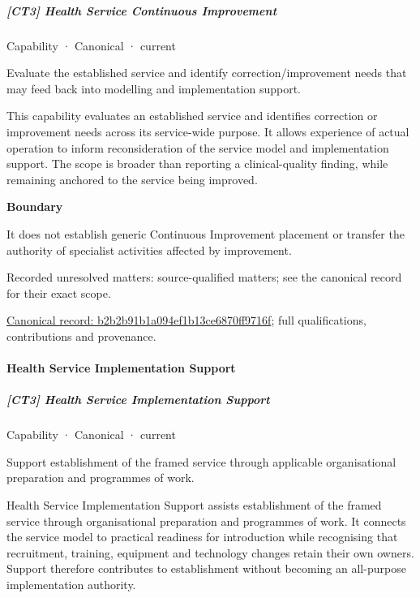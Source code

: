 \subparagraph{[CT3] Health Service Continuous Improvement}

\label{element:b2b2b91b1a094ef1b13ce6870ff9716f}
{\small Capability · Canonical · current}\par

Evaluate the established service and identify correction/improvement needs that may feed back into modelling and implementation support.



This capability evaluates an established service and identifies correction or improvement needs across its service-wide purpose. It allows experience of actual operation to inform reconsideration of the service model and implementation support. The scope is broader than reporting a clinical-quality finding, while remaining anchored to the service being improved.



\textbf{Boundary}



It does not establish generic Continuous Improvement placement or transfer the authority of specialist activities affected by improvement.


{\small Recorded unresolved matters: source-qualified matters; see the canonical record for their exact scope.}\par
{\footnotesize \href{../../../../continuum/strategy/capability/b2b2b91b1a094ef1b13ce6870ff9716f.md}{Canonical record: b2b2b91b1a094ef1b13ce6870ff9716f}; full qualifications, contributions and provenance.}\par
\paragraph{Health Service Implementation Support}

\subparagraph{[CT3] Health Service Implementation Support}

\label{element:f74f5944573b408d94fe8c88e33e128a}
{\small Capability · Canonical · current}\par

Support establishment of the framed service through applicable organisational preparation and programmes of work.



Health Service Implementation Support assists establishment of the framed service through organisational preparation and programmes of work. It connects the service model to practical readiness for introduction while recognising that recruitment, training, equipment and technology changes retain their own owners. Support therefore contributes to establishment without becoming an all-purpose implementation authority.



